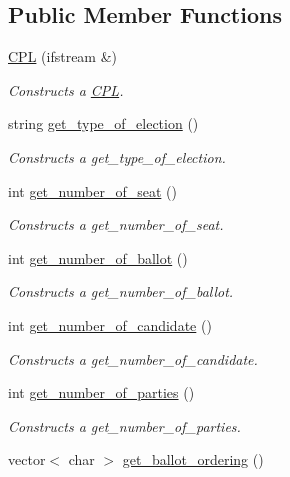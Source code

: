 \subsection*{Public Member Functions}
\begin{DoxyCompactItemize}
\item 
\hyperlink{classCPL_ac3a4ce447f08fa90208091138bbd2682}{C\+PL} (ifstream \&)
\begin{DoxyCompactList}\small\item\em Constructs a \hyperlink{classCPL}{C\+PL}. \end{DoxyCompactList}\item 
string \hyperlink{classCPL_a80e84330c07d424d857836538515be99}{get\+\_\+type\+\_\+of\+\_\+election} ()
\begin{DoxyCompactList}\small\item\em Constructs a get\+\_\+type\+\_\+of\+\_\+election. \end{DoxyCompactList}\item 
int \hyperlink{classCPL_a1493855f5ec961e018e2c9c3bfe11c7f}{get\+\_\+number\+\_\+of\+\_\+seat} ()
\begin{DoxyCompactList}\small\item\em Constructs a get\+\_\+number\+\_\+of\+\_\+seat. \end{DoxyCompactList}\item 
int \hyperlink{classCPL_a2425a880e70c142b80678215be6786e3}{get\+\_\+number\+\_\+of\+\_\+ballot} ()
\begin{DoxyCompactList}\small\item\em Constructs a get\+\_\+number\+\_\+of\+\_\+ballot. \end{DoxyCompactList}\item 
int \hyperlink{classCPL_a52108f0b6bcaa0e5062d5ecb2dd2d534}{get\+\_\+number\+\_\+of\+\_\+candidate} ()
\begin{DoxyCompactList}\small\item\em Constructs a get\+\_\+number\+\_\+of\+\_\+candidate. \end{DoxyCompactList}\item 
int \hyperlink{classCPL_a72780d6cddbb31cc03def8eb6a395c58}{get\+\_\+number\+\_\+of\+\_\+parties} ()
\begin{DoxyCompactList}\small\item\em Constructs a get\+\_\+number\+\_\+of\+\_\+parties. \end{DoxyCompactList}\item 
vector$<$ char $>$ \hyperlink{classCPL_ab9234cb8c50dfe8696dc38ece07edb26}{get\+\_\+ballot\+\_\+ordering} ()

\end{DoxyCompactItemize}
